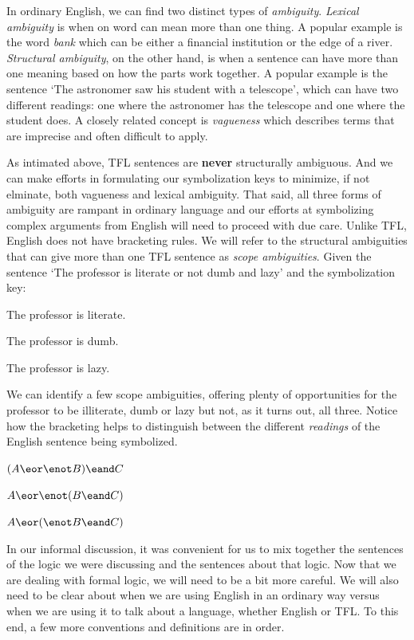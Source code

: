 In ordinary English, we can find two distinct types of \emph{ambiguity}. \emph{Lexical
ambiguity} is when on word can mean more than one thing. A popular example is the word
\emph{bank} which can be either a financial institution or the edge of a river. \emph{
Structural ambiguity}, on the other hand, is when a sentence can have more than one
meaning based on how the parts work together. A popular example is the sentence
`The astronomer saw his student with a telescope', which can have two different readings:
one where the astronomer has the telescope and one where the student does. A closely
related concept is \emph{vagueness} which describes terms that are imprecise and often
difficult to apply.

As intimated above, TFL sentences are \textbf{never} structurally ambiguous. And we can
make efforts in formulating our symbolization keys to minimize, if not elminate, both
vagueness and lexical ambiguity. That said, all three forms of ambiguity are rampant in
ordinary language and our efforts at symbolizing complex arguments from English will
need to proceed with due care. Unlike TFL, English does not have bracketing rules. We
will refer to the structural ambiguities that can give more than one TFL sentence as
\emph{scope ambiguities}. Given the sentence `The professor is literate or not
dumb and lazy' and the symbolization key:

\begin{argument}
\item[A:] The professor is literate.
\item[B:] The professor is dumb.
\item[C:] The professor is lazy.
\end{argument}

We can identify a few scope ambiguities, offering plenty of opportunities for the
professor to be illiterate, dumb or lazy but not, as it turns out, all three. Notice
how the bracketing helps to distinguish between the different \emph{readings} of the
English sentence being symbolized.

\begin{argument}
  \item[] $(A \eor \enot B) \eand C$
  \item[] $A \eor \enot (B \eand C)$
  \item[] $A \eor (\enot B \eand C)$
\end{argument}

In our informal discussion, it was convenient for us to mix together the sentences of
the logic we were discussing and the sentences about that logic. Now that we are dealing
with formal logic, we will need to be a bit more careful. We will also need to be clear
about when we are using English in an ordinary way versus when we are using it to talk
about a language, whether English or TFL. To this end, a few more conventions and
definitions are in order.

